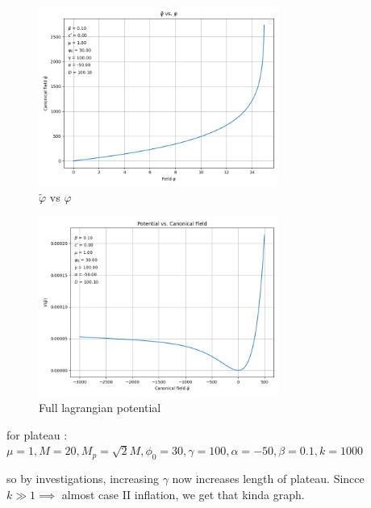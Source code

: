 \documentclass{article}
\begin{document}
\begin{figure}[h!]
    \centering
    \includegraphics[width=0.7\textwidth]{Python/Figures/Field vs Canonical Field.png}
    \caption{$\tilde{\varphi}$ vs $\varphi$}
    \label{Canonical field vs field}
\end{figure}

\begin{figure}[h!]
    \centering
    \includegraphics[width=0.7\textwidth]{Python/Figures/Full Lagrangian potential.png}
    \caption{Full lagrangian potential}
    \label{Full lagrangian potential}
\end{figure}




for plateau : $\mu = 1, M = 20  ,M_p = \sqrt2 M ,\phi_0 = 30, \gamma = 100 ,\alpha = -50 ,\beta = 0.1 ,k = 1000$

so by investigations, increasing $\gamma$ now increases length of plateau. Sincce $k \gg 1 \implies$ almost case II inflation, we get that kinda graph.

\newpage

\printbibliography
\end{document}
